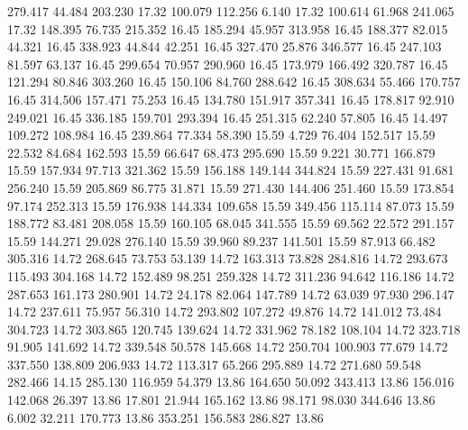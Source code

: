  279.417   44.484  203.230        17.32
 100.079  112.256    6.140        17.32
 100.614   61.968  241.065        17.32
 148.395   76.735  215.352        16.45
 185.294   45.957  313.958        16.45
 188.377   82.015   44.321        16.45
 338.923   44.844   42.251        16.45
 327.470   25.876  346.577        16.45
 247.103   81.597   63.137        16.45
 299.654   70.957  290.960        16.45
 173.979  166.492  320.787        16.45
 121.294   80.846  303.260        16.45
 150.106   84.760  288.642        16.45
 308.634   55.466  170.757        16.45
 314.506  157.471   75.253        16.45
 134.780  151.917  357.341        16.45
 178.817   92.910  249.021        16.45
 336.185  159.701  293.394        16.45
 251.315   62.240   57.805        16.45
  14.497  109.272  108.984        16.45
 239.864   77.334   58.390        15.59
   4.729   76.404  152.517        15.59
  22.532   84.684  162.593        15.59
  66.647   68.473  295.690        15.59
   9.221   30.771  166.879        15.59
 157.934   97.713  321.362        15.59
 156.188  149.144  344.824        15.59
 227.431   91.681  256.240        15.59
 205.869   86.775   31.871        15.59
 271.430  144.406  251.460        15.59
 173.854   97.174  252.313        15.59
 176.938  144.334  109.658        15.59
 349.456  115.114   87.073        15.59
 188.772   83.481  208.058        15.59
 160.105   68.045  341.555        15.59
  69.562   22.572  291.157        15.59
 144.271   29.028  276.140        15.59
  39.960   89.237  141.501        15.59
  87.913   66.482  305.316        14.72
 268.645   73.753   53.139        14.72
 163.313   73.828  284.816        14.72
 293.673  115.493  304.168        14.72
 152.489   98.251  259.328        14.72
 311.236   94.642  116.186        14.72
 287.653  161.173  280.901        14.72
  24.178   82.064  147.789        14.72
  63.039   97.930  296.147        14.72
 237.611   75.957   56.310        14.72
 293.802  107.272   49.876        14.72
 141.012   73.484  304.723        14.72
 303.865  120.745  139.624        14.72
 331.962   78.182  108.104        14.72
 323.718   91.905  141.692        14.72
 339.548   50.578  145.668        14.72
 250.704  100.903   77.679        14.72
 337.550  138.809  206.933        14.72
 113.317   65.266  295.889        14.72
 271.680   59.548  282.466        14.15
 285.130  116.959   54.379        13.86
 164.650   50.092  343.413        13.86
 156.016  142.068   26.397        13.86
  17.801   21.944  165.162        13.86
  98.171   98.030  344.646        13.86
   6.002   32.211  170.773        13.86
 353.251  156.583  286.827        13.86
